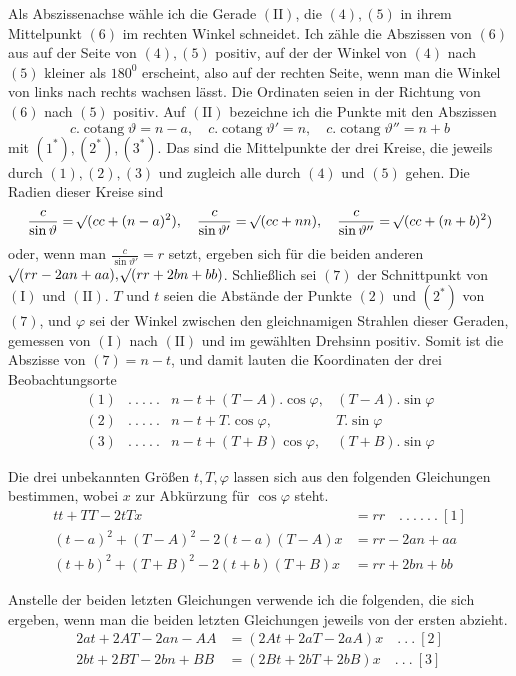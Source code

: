 %
\par
Als Abszissenachse wähle ich die Gerade \(\mathrm{(II)}\), die \((4),(5)\) in ihrem Mittelpunkt \((6)\) im rechten Winkel schneidet. Ich zähle die Abszissen von \((6)\) aus auf der Seite von \((4),(5)\) positiv, auf der der Winkel von \((4)\) nach \((5)\) kleiner als \(180^0\) erscheint, also auf der rechten Seite, wenn man die Winkel von links nach rechts wachsen lässt. Die Ordinaten seien in der Richtung von \((6)\) nach \((5)\) positiv. Auf \(\mathrm{(II)}\) bezeichne ich die Punkte mit den Abszissen
\[c.\operatorname{cotang}\vartheta=n-a,\quad c.\operatorname{cotang}\vartheta'=n,\quad c.\operatorname{cotang}\vartheta''=n+b\]
mit \((1^*),(2^*),(3^*)\). Das sind die Mittelpunkte der drei Kreise, die jeweils durch \((1),(2),(3)\) und zugleich alle durch \((4)\) und \((5)\) gehen. Die Radien dieser Kreise sind
\[\frac c{\sin\vartheta}=\mathord{{}^{}\!\surd}(cc+(n-a)^2),\quad\frac c{\sin\vartheta'}=\mathord{{}^{}\!\surd}(cc+nn),\quad\frac c{\sin\vartheta''}=\mathord{{}^{}\!\surd}(cc+(n+b)^2)\]
oder, wenn man \(\frac c{\sin\vartheta'}=r\) setzt, ergeben sich für die beiden anderen \(\mathord{{}^{}\!\surd}(rr-2an+aa),\mathord{{}^{}\!\surd}(rr+2bn+bb)\). Schließlich sei \((7)\) der Schnittpunkt von \(\mathrm{(I)}\) und \(\mathrm{(II)}\). \(T\) und \(t\) seien die Abstände der Punkte \((2)\) und \((2^*)\) von \((7)\), und \(\varphi\) sei der Winkel zwischen den gleichnamigen Strahlen dieser Geraden, gemessen von \(\mathrm{(I)}\) nach \(\mathrm{(II)}\) und im gewählten Drehsinn positiv. Somit ist die Abszisse von \((7)=n-t\), und damit lauten die Koordinaten der drei Beobachtungsorte
\[\begin{array}{rcll}(1)&.\ .\ .\ .\ .&n-t+(T-A).\cos\varphi,&(T-A).\sin\varphi\\
(2)&.\ .\ .\ .\ .&n-t+T.\cos\varphi,&T.\sin\varphi\\
(3)&.\ .\ .\ .\ .&n-t+(T+B)\cos\varphi,&(T+B).\sin\varphi\end{array}\]
\par
Die drei unbekannten Größen \(t,T,\varphi\) lassen sich aus den folgenden Gleichungen bestimmen, wobei \(x\) zur Abkürzung für \(\cos\varphi\) steht.
\[\begin{aligned}tt+TT-2tTx&=rr\quad.\ .\ .\ .\ .\ .\ [1]\\
(t-a)^2+(T-A)^2-2(t-a)(T-A)x&=rr-2an+aa\\
(t+b)^2+(T+B)^2-2(t+b)(T+B)x&=rr+2bn+bb\end{aligned}\]
\par
Anstelle der beiden letzten Gleichungen verwende ich die folgenden, die sich ergeben, wenn man die beiden letzten Gleichungen jeweils von der ersten abzieht.
\[\begin{aligned}2at+2AT-2an-AA&=(2At+2aT-2aA)x\quad.\ .\ .\ [2]\\
2bt+2BT-2bn+BB&=(2Bt+2bT+2bB)x\quad.\ .\ .\ [3]\end{aligned}\]
